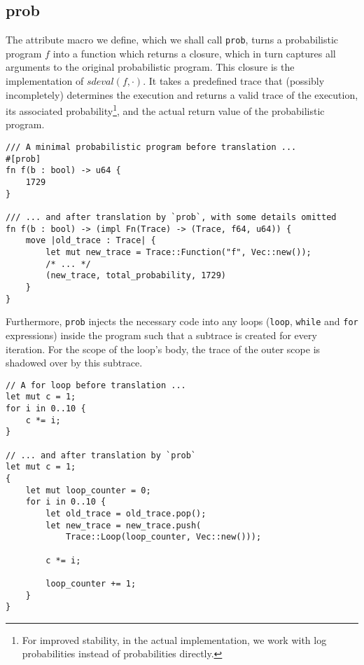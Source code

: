 \subsection{prob}

The attribute macro we define, which we shall call \lstinline{prob}, turns a probabilistic program $f$ into a function which returns a closure, which in turn captures all arguments to the original probabilistic program. This closure is the implementation of $sdeval(f,\cdot)$. It takes a predefined trace that (possibly incompletely) determines the execution and returns a valid trace of the execution, its associated probability\footnote{For improved stability, in the actual implementation, we work with log probabilities instead of probabilities directly.}, and the actual return value of the probabilistic program.

\begin{minipage}{\linewidth}
\begin{lstlisting}
/// A minimal probabilistic program before translation ...
#[prob]
fn f(b : bool) -> u64 {
    1729
}

/// ... and after translation by `prob`, with some details omitted
fn f(b : bool) -> (impl Fn(Trace) -> (Trace, f64, u64)) {
    move |old_trace : Trace| {
        let mut new_trace = Trace::Function("f", Vec::new());
        /* ... */
        (new_trace, total_probability, 1729)
    }
}
\end{lstlisting}
\end{minipage}

Furthermore, \lstinline{prob} injects the necessary code into any loops (\lstinline{loop}, \lstinline{while} and \lstinline{for} expressions) inside the program such that a subtrace is created for every iteration. For the scope of the loop's body, the trace of the outer scope is shadowed over by this subtrace.

\begin{minipage}{\linewidth}
\begin{lstlisting}
// A for loop before translation ...
let mut c = 1;
for i in 0..10 {
    c *= i;
}

// ... and after translation by `prob`
let mut c = 1;
{
    let mut loop_counter = 0;
    for i in 0..10 {
        let old_trace = old_trace.pop();
        let new_trace = new_trace.push(
            Trace::Loop(loop_counter, Vec::new()));

        c *= i;

        loop_counter += 1;
    }
}
\end{lstlisting}
\end{minipage}

